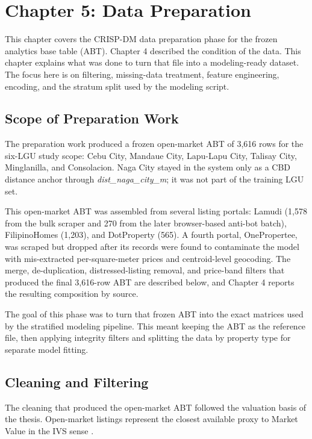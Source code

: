 \section{Chapter 5: Data Preparation}\label{data-preparation}

This chapter covers the CRISP-DM data preparation phase for the frozen analytics base table (ABT). Chapter 4 described the condition of the data. This chapter explains what was done to turn that file into a modeling-ready dataset. The focus here is on filtering, missing-data treatment, feature engineering, encoding, and the stratum split used by the modeling script.

\subsection{Scope of Preparation Work}\label{scope-of-preparation-work}

The preparation work produced a frozen open-market ABT of 3{,}616 rows for the six-LGU study scope: Cebu City, Mandaue City, Lapu-Lapu City, Talisay City, Minglanilla, and Consolacion. Naga City stayed in the system only as a CBD distance anchor through \emph{dist\_naga\_city\_m}; it was not part of the training LGU set.

This open-market ABT was assembled from several listing portals: Lamudi (1{,}578 from the bulk scraper and 270 from the later browser-based anti-bot batch), FilipinoHomes (1{,}203), and DotProperty (565). A fourth portal, OnePropertee, was scraped but dropped after its records were found to contaminate the model with mis-extracted per-square-meter prices and centroid-level geocoding. The merge, de-duplication, distressed-listing removal, and price-band filters that produced the final 3{,}616-row ABT are described below, and Chapter 4 reports the resulting composition by source.

The goal of this phase was to turn that frozen ABT into the exact matrices used by the stratified modeling pipeline. This meant keeping the ABT as the reference file, then applying integrity filters and splitting the data by property type for separate model fitting.


\subsection{Cleaning and Filtering}\label{cleaning-and-filtering}

The cleaning that produced the open-market ABT followed the valuation basis of the thesis. Open-market listings represent the closest available proxy to Market Value in the IVS sense \parencite{ivs2025}.

